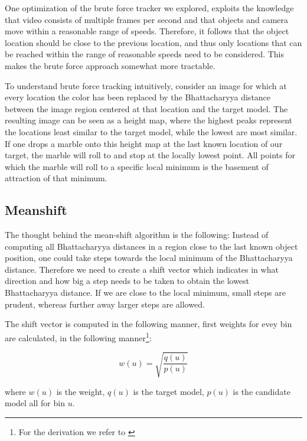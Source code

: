 \documentclass[a4paper,11pt]{article}
\begin{document}
One optimization of the brute force tracker we explored, exploits the knowledge that video consists of multiple frames per second and that objects and camera move within a reasonable range of speeds. Therefore, it follows that the object location should be close to the previous location, and thus only locations that can be reached within the range of reasonable speeds need to be considered. This makes the brute force approach somewhat more tractable. 

To understand brute force tracking intuitively, consider an image for which at every location the color has been replaced by the Bhattacharyya distance between the image region centered at that location and the target model. The resulting image can be seen as a height map, where the highest peaks represent the locations least similar to the target model, while the lowest are most similar. If one drops a marble onto this height map at the last known location of our target, the marble will roll to and stop at the locally lowest point. All points for which the marble will roll to a specific local minimum is the basement of attraction of that minimum. 

\subsection{Meanshift}

The thought behind the mean-shift algorithm is the following: Instead of computing all Bhattacharyya distances in a region close to the last known object position, one could take steps towards the local minimum of the Bhattacharyya distance. Therefore we need to create a shift vector which indicates in what direction and how big a step needs to be taken to obtain the lowest Bhattacharyya distance. If we are close to the local minimum, small steps are prudent, whereas further away larger steps are allowed. 



The shift vector is computed in the following manner, first weights for evey bin are calculated, in the following manner\footnote{For the derivation we refer to \cite{mean_shift}\label{fn:derivation_refer}}:



\begin{equation}
\label{eq:weights}
w(u) = \sqrt{\frac{q(u)}{p(u)}}
\end{equation} %

where $w(u)$ is the weight, $q(u)$ is the target model, $p(u)$ is the candidate model all for bin $u$.
\end{document}
